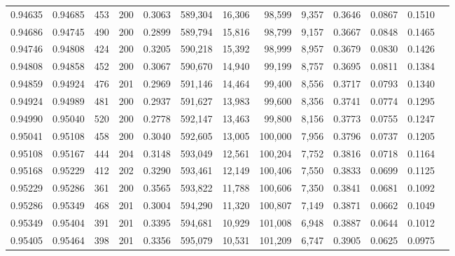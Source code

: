 \begin{tabular}{rrrrrrrrrrrrr}
0.94635 & 0.94685 &   453 & 200 &                                     0.3063 & 589,304 &  16,306 &  98,599 &   9,357 & 0.3646 & 0.0867 & 0.1510 \\
0.94686 & 0.94745 &   490 & 200 &                                     0.2899 & 589,794 &  15,816 &  98,799 &   9,157 & 0.3667 & 0.0848 & 0.1465 \\
0.94746 & 0.94808 &   424 & 200 &                                     0.3205 & 590,218 &  15,392 &  98,999 &   8,957 & 0.3679 & 0.0830 & 0.1426 \\
0.94808 & 0.94858 &   452 & 200 &                                     0.3067 & 590,670 &  14,940 &  99,199 &   8,757 & 0.3695 & 0.0811 & 0.1384 \\
0.94859 & 0.94924 &   476 & 201 &                                     0.2969 & 591,146 &  14,464 &  99,400 &   8,556 & 0.3717 & 0.0793 & 0.1340 \\
0.94924 & 0.94989 &   481 & 200 &                                     0.2937 & 591,627 &  13,983 &  99,600 &   8,356 & 0.3741 & 0.0774 & 0.1295 \\
0.94990 & 0.95040 &   520 & 200 &                                     0.2778 & 592,147 &  13,463 &  99,800 &   8,156 & 0.3773 & 0.0755 & 0.1247 \\
0.95041 & 0.95108 &   458 & 200 &                                     0.3040 & 592,605 &  13,005 & 100,000 &   7,956 & 0.3796 & 0.0737 & 0.1205 \\
0.95108 & 0.95167 &   444 & 204 &                                     0.3148 & 593,049 &  12,561 & 100,204 &   7,752 & 0.3816 & 0.0718 & 0.1164 \\
0.95168 & 0.95229 &   412 & 202 &                                     0.3290 & 593,461 &  12,149 & 100,406 &   7,550 & 0.3833 & 0.0699 & 0.1125 \\
0.95229 & 0.95286 &   361 & 200 &                                     0.3565 & 593,822 &  11,788 & 100,606 &   7,350 & 0.3841 & 0.0681 & 0.1092 \\
0.95286 & 0.95349 &   468 & 201 &                                     0.3004 & 594,290 &  11,320 & 100,807 &   7,149 & 0.3871 & 0.0662 & 0.1049 \\
0.95349 & 0.95404 &   391 & 201 &                                     0.3395 & 594,681 &  10,929 & 101,008 &   6,948 & 0.3887 & 0.0644 & 0.1012 \\
0.95405 & 0.95464 &   398 & 201 &                                     0.3356 & 595,079 &  10,531 & 101,209 &   6,747 & 0.3905 & 0.0625 & 0.0975 \\

\end{tabular}
